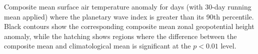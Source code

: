 \label{fig:tas_composite}
Composite mean surface air temperature anomaly for days (with 30-day running mean applied) where the planetary wave index is greater than its 90th percentile. Black contours show the corresponding composite mean zonal geopotential height anomaly, while the hatching shows regions where the difference between the composite mean and climatological mean is significant at the $p < 0.01$ level.  